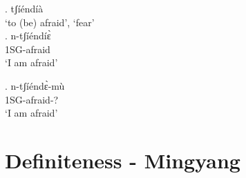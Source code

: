 \documentclass{assets/fieldnotes}
\begin{document}
\ex. tʃíéndíà\\
`to (be) afraid’, `fear’\\

\exg. n-tʃíéndíɛ̀\\
1SG-afraid\\
`I am afraid'

\exg. n-tʃíéndɛ̀-mù\\
1SG-afraid-?\\
`I am afraid'



\section{Definiteness - Mingyang}
\end{document}

